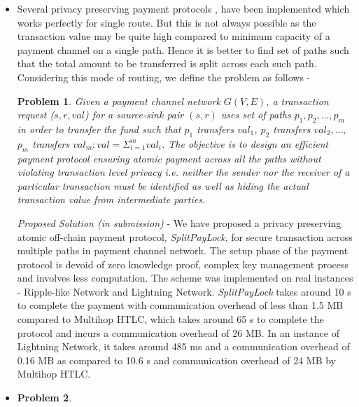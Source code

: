 \documentclass[10pt]{article}
\newtheorem{problem}{\textbf{Problem}}
\begin{document}
\begin{itemize}
\item Several privacy preserving payment protocols \cite{malavolta}, \cite{malavoltamulti} have been implemented which works perfectly for single route. But this is not always possible as the transaction value may be quite high compared to minimum capacity of a payment channel on a single path. Hence it is better to find set of paths such that the total amount to be transferred is split across each such path. Considering this mode of routing, we define the problem as follows -
\begin{problem}
\textit{Given a payment channel network $G(V,E)$, a transaction request ($s,r,val$) for a source-sink pair $(s,r)$ uses set of paths $p_1,p_2,\ldots,p_m$ in order to transfer the fund such that $p_1$ transfers $val_1$, $p_2$ transfers $val_2,\ldots,$ $p_m$ transfers $val_m : val=\Sigma_{i=1}^m val_i$. The objective is to design an efficient payment protocol ensuring atomic payment across all the paths without violating \textit{transaction level privacy} i.e. neither the sender nor the receiver of a particular transaction must be identified as well as hiding the actual transaction value from intermediate parties.}
\end{problem}
\emph{Proposed Solution (in submission)} - We have proposed a privacy preserving atomic off-chain payment protocol, \textit{SplitPayLock}, for secure transaction across multiple paths in payment channel network. The setup phase of the payment protocol is devoid of zero knowledge proof, complex key management process and involves less computation. The scheme was implemented on real instances - Ripple-like Network \cite{malavolta} and Lightning Network\cite{seres2019topological}.  \emph{SplitPayLock} takes around 10 s to complete the payment with communication overhead of less than 1.5 MB compared to Multihop HTLC, which takes around 65 s to complete the protocol and incurs a communication overhead of 26 MB. In an instance of Lightning Network, it takes around 485 ms and a communication overhead of 0.16 MB as compared to 10.6 s and communication overhead of 24 MB by Multihop HTLC.  



\item \begin{problem}


\end{problem}
\end{itemize}
\end{document}
